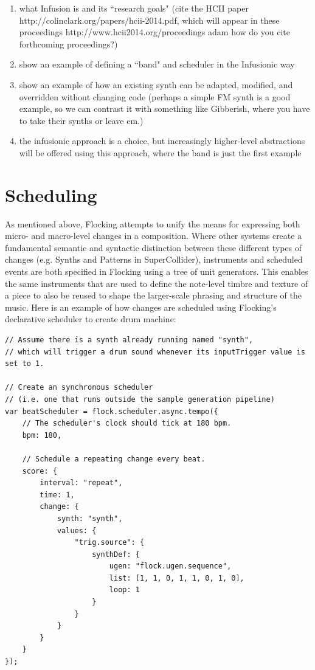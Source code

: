 \documentclass{article}
\begin{document}
\begin{enumerate}
\item what Infusion is and its ``research goals" (cite the HCII paper http://colinclark.org/papers/hcii-2014.pdf, which will appear in these proceedings http://www.hcii2014.org/proceedings adam how do you cite forthcoming proceedings?)
\item show an example of defining a ``band" and scheduler in the Infusionic way
\item show an example of how an existing synth can be adapted, modified, and overridden without changing code (perhaps a simple FM synth is a good example, so we can contrast it with something like Gibberish, where you have to take their synths or leave em.)
\item the infusionic approach is a choice, but increasingly higher-level abstractions will be offered using this approach, where the band is just the first example
\end{enumerate}

\section{Scheduling} \label{sec:Scheduling}

As mentioned above, Flocking attempts to unify the means for expressing both micro- and macro-level changes in a composition. Where other systems create a fundamental semantic and syntactic distinction between these different types of changes (e.g. Synths and Patterns in SuperCollider), instruments and scheduled events are both specified in Flocking using a tree of unit generators. This enables the same instruments that are used to define the note-level timbre and texture of a piece to also be reused to shape the larger-scale phrasing and structure of the music. Here is an example of how changes are scheduled using Flocking's declarative scheduler to create drum machine:

\begin{verbatim}
// Assume there is a synth already running named "synth",
// which will trigger a drum sound whenever its inputTrigger value is set to 1.

// Create an synchronous scheduler
// (i.e. one that runs outside the sample generation pipeline)
var beatScheduler = flock.scheduler.async.tempo({
    // The scheduler's clock should tick at 180 bpm.
    bpm: 180,

    // Schedule a repeating change every beat.
    score: {
        interval: "repeat",
        time: 1,
        change: {
            synth: "synth",
            values: {
                "trig.source": {
                    synthDef: {
                        ugen: "flock.ugen.sequence",
                        list: [1, 1, 0, 1, 1, 0, 1, 0],
                        loop: 1
                    }
                }
            }
        }
    }
});

\end{verbatim}
\end{document}
